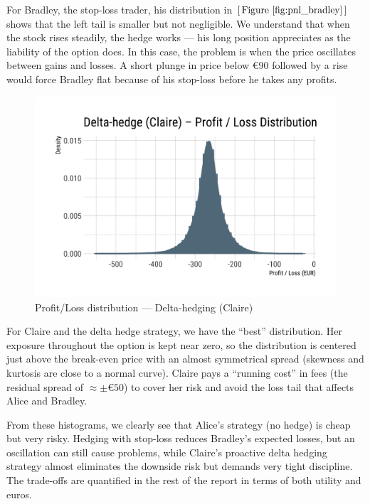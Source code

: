\documentclass[11pt,a4paper]{article}
\begin{document}
For Bradley, the stop-loss trader, his distribution in \([\,\text{Figure~\ref{fig:pnl_bradley}}\,]\) shows that the left tail is smaller but not negligible. We understand that when the stock rises steadily, the hedge works — his long position appreciates as the liability of the option does. In this case, the problem is when the price oscillates between gains and losses. A short plunge in price below €90 followed by a rise would force Bradley flat because of his stop-loss before he takes any profits.

\begin{figure}[H]
	\centering
	\includegraphics[width=0.85\linewidth]{figures/pnl_claire.png}
	\caption{Profit/Loss distribution — Delta-hedging (Claire)}
	\label{fig:pnl_claire}
\end{figure}

For Claire and the delta hedge strategy, we have the ``best'' distribution. Her exposure throughout the option is kept near zero, so the distribution is centered just above the break-even price with an almost symmetrical spread (skewness and kurtosis are close to a normal curve). Claire pays a ``running cost'' in fees (the residual spread of \(\approx \pm€50\)) to cover her risk and avoid the loss tail that affects Alice and Bradley.

From these histograms, we clearly see that Alice’s strategy (no hedge) is cheap but very risky. Hedging with stop-loss reduces Bradley’s expected losses, but an oscillation can still cause problems, while Claire’s proactive delta hedging strategy almost eliminates the downside risk but demands very tight discipline. The trade-offs are quantified in the rest of the report in terms of both utility and euros.
\end{document}
